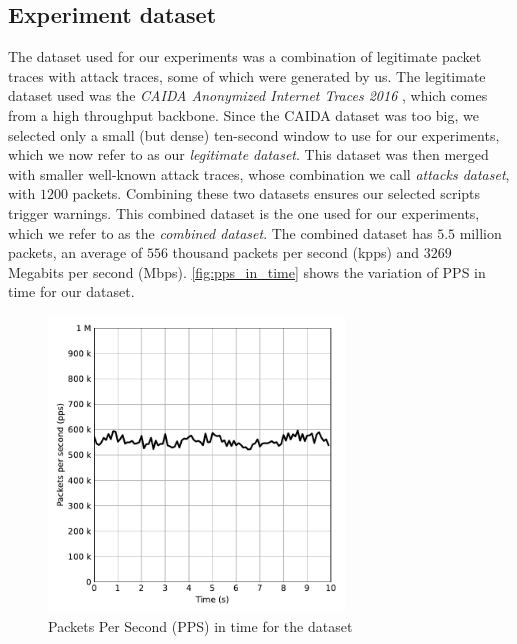 


\subsection{Experiment dataset}

The dataset used for our experiments was a combination of legitimate packet traces with attack traces, some of which were generated by us. The legitimate dataset used was the \textit{CAIDA Anonymized Internet Traces 2016} \cite{CAIDA2016}, which comes from a high throughput backbone. Since the CAIDA dataset was too big, we selected only a small (but dense) ten-second window to use for our experiments, which we now refer to as our \textit{legitimate dataset}. This dataset was then merged with smaller well-known attack traces, whose combination we call \textit{attacks dataset}, with $1200$ packets. Combining these two datasets ensures our selected scripts trigger warnings. This combined dataset is the one used for our experiments, which we refer to as the \textit{combined dataset}. The combined dataset has $5.5$ million packets, an average of $556$ thousand packets per second (kpps) and $3269$ Megabits per second (Mbps). \autoref{fig:pps_in_time} shows the variation of PPS in time for our dataset.

\begin{figure}[htb]
    \caption{Packets Per Second (PPS) in time for the dataset}
    \begin{center}
        \includegraphics[width=0.7\textwidth]{images/pps_in_time.pdf}  
    \end{center}
    \label{fig:pps_in_time}
\end{figure}

